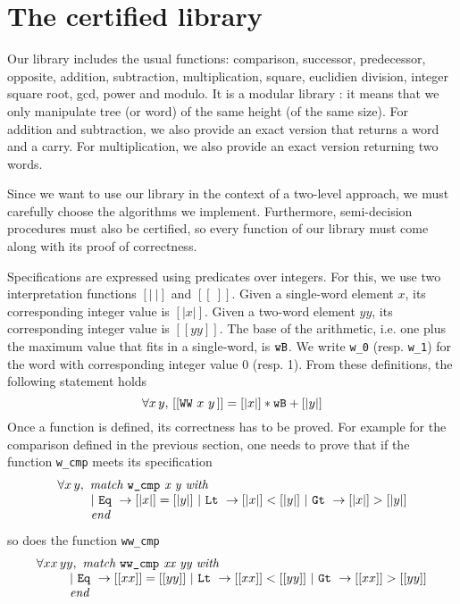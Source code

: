 \section{The certified library \label{Op}}
Our library includes the usual functions:
comparison, successor, predecessor, opposite, addition, subtraction,
multiplication, square, euclidien division, integer square root, gcd, 
power and modulo.
It is a modular library : it means that we only manipulate tree (or word)
of the same height (of the same size). 
For addition and subtraction, we also provide an exact version
that returns a word and a carry.
For multiplication, we also provide an exact version
returning two words. 

Since we want to use our library in the context of a two-level approach,
we must carefully choose the algorithms we implement.
Furthermore, semi-decision procedures must also be certified, 
so every function of our library must come along with its proof 
of correctness. 

Specifications are expressed using predicates over integers. For this, 
we use two interpretation functions
{$ [|\ |]$} and {$[[\ ]]$}.
Given a single-word element $x$, its corresponding integer value
is $[|x|]$. Given a two-word element $yy$, its corresponding
integer value is $[[yy]]$. The base of the arithmetic, i.e.
one plus the maximum value that fits in a single-word, is ${\texttt{wB}}$. 
We write {\tt w\_0} (resp. {\tt w\_1}) for the word with 
corresponding integer value 0 (resp. 1).
From these definitions, the following statement holds
$$\forall x\, y,\, [[\texttt{WW}\,\,x\,\,y\,]] = [|x|] * {\texttt{wB}} + [|y|]$$
Once a function is defined, its correctness has to be proved.
For example for the comparison defined in the previous section,
one needs to prove that if the function {\tt w\_cmp} meets its specification
$$\begin{array}{l}
\forall x\, y, \,\, \textit{match {\tt w\_cmp} x y with} \\
\qquad\,\,\,\,
 |\,\, \texttt{Eq}\,\, \rightarrow [|x|] = [|y|]\,\, | \,\,\texttt{Lt}\,\, \rightarrow [|x|] < [|y|] \,\,
| \,\,\texttt{Gt}\,\, \rightarrow [|x|] > [|y|]\\
\qquad\,\,\,\, \textit{end}
\end{array}
$$
so does the function {\tt ww\_cmp}
$$\begin{array}{l}
\forall xx\, yy, \,\, \textit{match {\tt ww\_cmp} xx yy with} \\
\qquad\,\,\,\,
 |\,\, \texttt{Eq}\,\, \rightarrow [[xx]] = [[yy]]\,\, | \,\,\texttt{Lt}\,\, \rightarrow [[xx]] < [[yy]] \,\,
| \,\,\texttt{Gt}\,\, \rightarrow [[xx]] > [[yy]]\\
\qquad\,\,\,\, \textit{end}
\end{array}
$$

